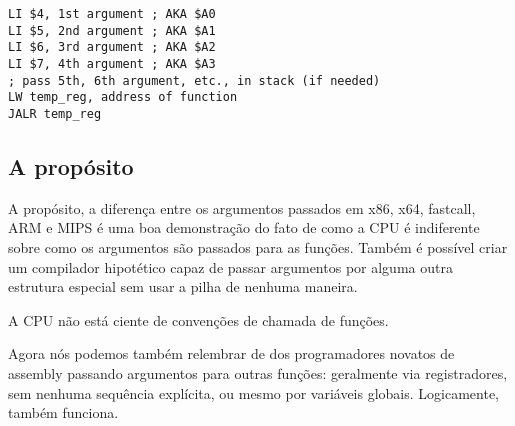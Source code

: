 \begin{lstlisting}[caption=MIPS (O32 calling convention),style=customasmMIPS]
LI $4, 1st argument ; AKA $A0
LI $5, 2nd argument ; AKA $A1
LI $6, 3rd argument ; AKA $A2
LI $7, 4th argument ; AKA $A3
; pass 5th, 6th argument, etc., in stack (if needed)
LW temp_reg, address of function
JALR temp_reg
\end{lstlisting}

\subsection{A propósito}

A propósito, a diferença entre os argumentos passados em x86, x64, fastcall, ARM e MIPS  é uma boa demonstração do fato de como a CPU é indiferente sobre como os argumentos são passados para as funções.
Também é possível criar um compilador hipotético capaz de passar argumentos por alguma outra estrutura especial sem usar a pilha de nenhuma maneira.

\PTBRph{}

A \ac{CPU} não está ciente de convenções de chamada de funções.

Agora nós podemos também relembrar de dos programadores novatos de assembly passando argumentos para outras funções:
geralmente via registradores, sem nenhuma sequência explícita, ou mesmo por variáveis globais. Logicamente, também funciona.

